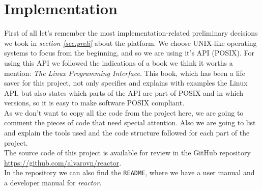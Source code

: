\chapter{Implementation}
\label{sec:imp}
First of all let's remember the most implementation-related preliminary decisions we took in \emph{section \ref{sec:preli}} about the 
platform. We choose UNIX-like operating systems to focus from the beginning, and so we are using it's API (POSIX). For using this API
we followed the indications of a book we think it worths a mention: \emph{The Linux Programming Interface}\cite{book:linuxapi}. This
book, which has been a life saver for this project, not only specifies and explains with examples the Linux API, but also states which
parts of the API are part of POSIX and in which versions, so it is easy to make software POSIX compliant.\\
As we don't want to copy all the code from the project here, we are going to comment the pieces of code that need special attention. Also
we are going to list and explain the tools used and the code structure followed for each part of the project.\\
The source code of this project is available for review in the GitHub repository 
\url{https://github.com/alvarovn/reactor}\cite{github:reactor}.\\
In the repository we can also find the \texttt{README}\cite{readme}, where we have a user manual and a developer manual for \emph{reactor}.
